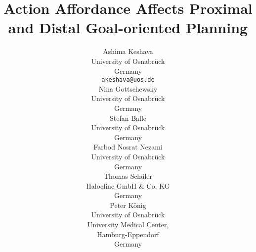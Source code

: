 \documentclass{article}
\begin{document}
\title{Action Affordance Affects Proximal and Distal Goal-oriented Planning}


\author{
  Ashima Keshava\\
  University of Osnabr{\"u}ck\\
  Germany\\
  \texttt{akeshava@uos.de} \\
   \And
   Nina Gottschewsky\\
  University of Osnabr{\"u}ck\\
  Germany\\
  \And
   Stefan Balle\\
  University of Osnabr{\"u}ck\\
  Germany\\
  \And
  Farbod Nosrat Nezami\\
  University of Osnabr{\"u}ck\\
  Germany\\
  \And
   Thomas Sch{\"u}ler\\
  Halocline GmbH \& Co. KG\\
  Germany\\
  \And
   Peter K{\"o}nig\\
   University of Osnabr{\"u}ck\\
   University Medical Center,\\ Hamburg-Eppendorf\\
   Germany
}
\maketitle
\begin{abstract}

\end{abstract}


\linenumbers
\captionsetup[figure]{font=scriptsize,labelfont=bf}






% 
\end{document}
